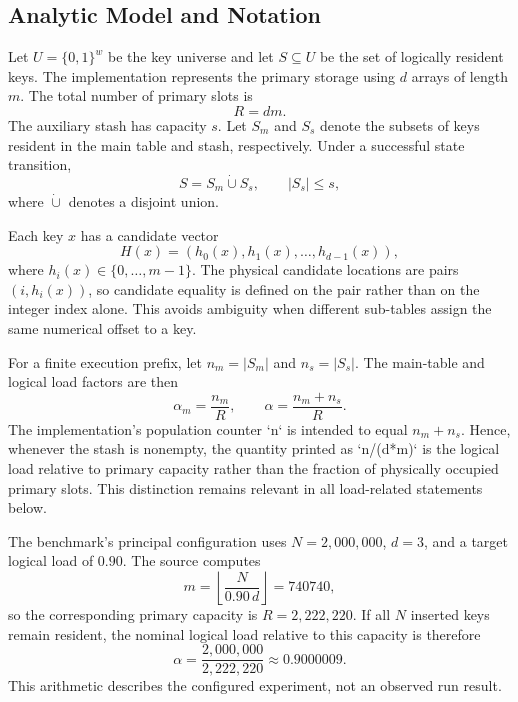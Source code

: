 \documentclass[conference]{IEEEtran}
\begin{document}
\subsection{Analytic Model and Notation}

Let $U=\{0,1\}^{w}$ be the key universe and let $S\subseteq U$ be the set of logically resident keys. The implementation represents the primary storage using $d$ arrays of length $m$. The total number of primary slots is
\begin{equation}
    R = dm.
    \label{eq:theory-primary-capacity}
\end{equation}
The auxiliary stash has capacity $s$. Let $S_m$ and $S_s$ denote the subsets of keys resident in the main table and stash, respectively. Under a successful state transition,
\begin{equation}
    S = S_m \mathbin{\dot\cup} S_s,
    \qquad |S_s|\le s,
    \label{eq:theory-residency}
\end{equation}
where $\dot\cup$ denotes a disjoint union.

Each key $x$ has a candidate vector
\begin{equation}
    H(x)=\left(h_0(x),h_1(x),\ldots,h_{d-1}(x)\right),
    \label{eq:theory-hash-vector}
\end{equation}
where $h_i(x)\in\{0,\ldots,m-1\}$. The physical candidate locations are pairs $(i,h_i(x))$, so candidate equality is defined on the pair rather than on the integer index alone. This avoids ambiguity when different sub-tables assign the same numerical offset to a key.

For a finite execution prefix, let $n_m=|S_m|$ and $n_s=|S_s|$. The main-table and logical load factors are then
\begin{equation}
    \alpha_m = \frac{n_m}{R},
    \qquad
    \alpha = \frac{n_m+n_s}{R}.
    \label{eq:theory-loads}
\end{equation}
The implementation's population counter `n` is intended to equal $n_m+n_s$. Hence, whenever the stash is nonempty, the quantity printed as `n/(d*m)` is the logical load relative to primary capacity rather than the fraction of physically occupied primary slots. This distinction remains relevant in all load-related statements below.

The benchmark's principal configuration uses $N=2{,}000{,}000$, $d=3$, and a target logical load of $0.90$. The source computes
\begin{equation}
    m=\left\lfloor\frac{N}{0.90\,d}\right\rfloor=740740,
\end{equation}
so the corresponding primary capacity is $R=2{,}222{,}220$. If all $N$ inserted keys remain resident, the nominal logical load relative to this capacity is therefore
\begin{equation}
    \alpha=\frac{2{,}000{,}000}{2{,}222{,}220}
    \approx 0.9000009.
    \label{eq:nominal-main-load}
\end{equation}
This arithmetic describes the configured experiment, not an observed run result.
\end{document}
